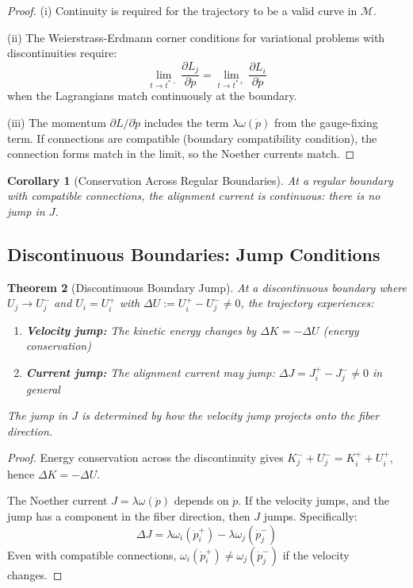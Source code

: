 \documentclass[11pt,a4paper]{article}
\newtheorem{theorem}{Theorem}[section]
\newtheorem{corollary}[theorem]{Corollary}
\begin{document}
\begin{proof}
(i) Continuity is required for the trajectory to be a valid curve in $\mathcal{M}$.

(ii) The Weierstrass-Erdmann corner conditions for variational problems with discontinuities require:
\[
    \lim_{t \to t^{*-}} \frac{\partial L_j}{\partial \dot{p}} = \lim_{t \to t^{*+}} \frac{\partial L_i}{\partial \dot{p}}
\]
when the Lagrangians match continuously at the boundary.

(iii) The momentum $\partial L / \partial \dot{p}$ includes the term $\lambda \omega(\dot{p})$ from the gauge-fixing term. If connections are compatible (boundary compatibility condition), the connection forms match in the limit, so the Noether currents match.
\end{proof}

\begin{corollary}[Conservation Across Regular Boundaries]
At a regular boundary with compatible connections, the alignment current is continuous: there is no jump in $J$.
\end{corollary}

\subsection{Discontinuous Boundaries: Jump Conditions}

\begin{theorem}[Discontinuous Boundary Jump]
At a discontinuous boundary where $U_j \to U_j^-$ and $U_i = U_i^+$ with $\Delta U := U_i^+ - U_j^- \neq 0$, the trajectory experiences:
\begin{enumerate}
    \item[(i)] \textbf{Velocity jump:} The kinetic energy changes by $\Delta K = -\Delta U$ (energy conservation)
    \item[(ii)] \textbf{Current jump:} The alignment current may jump: $\Delta J = J_i^+ - J_j^- \neq 0$ in general
\end{enumerate}

The jump in $J$ is determined by how the velocity jump projects onto the fiber direction.
\end{theorem}

\begin{proof}
Energy conservation across the discontinuity gives $K_j^- + U_j^- = K_i^+ + U_i^+$, hence $\Delta K = -\Delta U$.

The Noether current $J = \lambda \omega(\dot{p})$ depends on $\dot{p}$. If the velocity jumps, and the jump has a component in the fiber direction, then $J$ jumps. Specifically:
\[
    \Delta J = \lambda \omega_i(\dot{p}_i^+) - \lambda \omega_j(\dot{p}_j^-)
\]
Even with compatible connections, $\omega_i(\dot{p}_i^+) \neq \omega_j(\dot{p}_j^-)$ if the velocity changes.
\end{proof}
\end{document}
